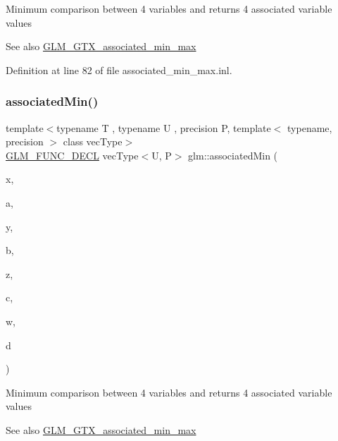 Minimum comparison between 4 variables and returns 4 associated variable values \begin{DoxySeeAlso}{See also}
\mbox{\hyperlink{group__gtx__associated__min__max}{G\+L\+M\+\_\+\+G\+T\+X\+\_\+associated\+\_\+min\+\_\+max}} 
\end{DoxySeeAlso}


Definition at line 82 of file associated\+\_\+min\+\_\+max.\+inl.

\mbox{\label{group__gtx__associated__min__max_ga88e031f22b80215505928900d3dde549}} 
\subsubsection{\texorpdfstring{associatedMin()}{associatedMin()}\hspace{0.1cm}{\footnotesize\ttfamily [8/10]}}
{\footnotesize\ttfamily template$<$typename T , typename U , precision P, template$<$ typename, precision $>$ class vec\+Type$>$ \\
\mbox{\hyperlink{setup_8hpp_ab2d052de21a70539923e9bcbf6e83a51}{G\+L\+M\+\_\+\+F\+U\+N\+C\+\_\+\+D\+E\+CL}} vec\+Type$<$U, P$>$ glm\+::associated\+Min (\begin{DoxyParamCaption}\item[{vec\+Type$<$ T, P $>$ const \&}]{x,  }\item[{vec\+Type$<$ U, P $>$ const \&}]{a,  }\item[{vec\+Type$<$ T, P $>$ const \&}]{y,  }\item[{vec\+Type$<$ U, P $>$ const \&}]{b,  }\item[{vec\+Type$<$ T, P $>$ const \&}]{z,  }\item[{vec\+Type$<$ U, P $>$ const \&}]{c,  }\item[{vec\+Type$<$ T, P $>$ const \&}]{w,  }\item[{vec\+Type$<$ U, P $>$ const \&}]{d }\end{DoxyParamCaption})}

Minimum comparison between 4 variables and returns 4 associated variable values \begin{DoxySeeAlso}{See also}
\mbox{\hyperlink{group__gtx__associated__min__max}{G\+L\+M\+\_\+\+G\+T\+X\+\_\+associated\+\_\+min\+\_\+max}} 
\end{DoxySeeAlso}


